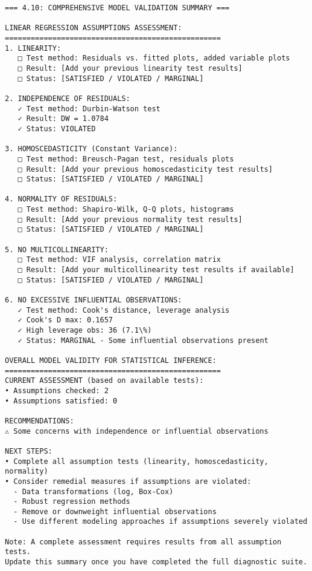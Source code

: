 \documentclass[11pt, twocolumn]{article}
\begin{document}
    \begin{Verbatim}[commandchars=\\\{\}]
=== 4.10: COMPREHENSIVE MODEL VALIDATION SUMMARY ===

LINEAR REGRESSION ASSUMPTIONS ASSESSMENT:
==================================================
1. LINEARITY:
   □ Test method: Residuals vs. fitted plots, added variable plots
   □ Result: [Add your previous linearity test results]
   □ Status: [SATISFIED / VIOLATED / MARGINAL]

2. INDEPENDENCE OF RESIDUALS:
   ✓ Test method: Durbin-Watson test
   ✓ Result: DW = 1.0784
   ✓ Status: VIOLATED

3. HOMOSCEDASTICITY (Constant Variance):
   □ Test method: Breusch-Pagan test, residuals plots
   □ Result: [Add your previous homoscedasticity test results]
   □ Status: [SATISFIED / VIOLATED / MARGINAL]

4. NORMALITY OF RESIDUALS:
   □ Test method: Shapiro-Wilk, Q-Q plots, histograms
   □ Result: [Add your previous normality test results]
   □ Status: [SATISFIED / VIOLATED / MARGINAL]

5. NO MULTICOLLINEARITY:
   □ Test method: VIF analysis, correlation matrix
   □ Result: [Add your multicollinearity test results if available]
   □ Status: [SATISFIED / VIOLATED / MARGINAL]

6. NO EXCESSIVE INFLUENTIAL OBSERVATIONS:
   ✓ Test method: Cook's distance, leverage analysis
   ✓ Cook's D max: 0.1657
   ✓ High leverage obs: 36 (7.1\%)
   ✓ Status: MARGINAL - Some influential observations present

OVERALL MODEL VALIDITY FOR STATISTICAL INFERENCE:
==================================================
CURRENT ASSESSMENT (based on available tests):
• Assumptions checked: 2
• Assumptions satisfied: 0

RECOMMENDATIONS:
⚠ Some concerns with independence or influential observations

NEXT STEPS:
• Complete all assumption tests (linearity, homoscedasticity, normality)
• Consider remedial measures if assumptions are violated:
  - Data transformations (log, Box-Cox)
  - Robust regression methods
  - Remove or downweight influential observations
  - Use different modeling approaches if assumptions severely violated

Note: A complete assessment requires results from all assumption tests.
Update this summary once you have completed the full diagnostic suite.
    \end{Verbatim}
\end{document}
